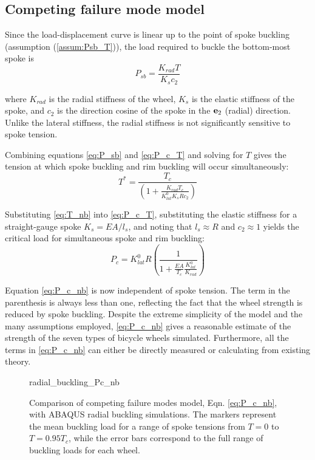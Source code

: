 \documentclass[\rootdir/thesis.tex]{subfiles}
\begin{document}
\subsection{Competing failure mode model}

Since the load-displacement curve is linear up to the point of spoke buckling (assumption (\ref{assum:Psb_T})), the load required to buckle the bottom-most spoke is
\begin{equation}
\label{eq:P_sb}
P_{sb} = \frac{K_{rad}T}{K_s c_2}
\end{equation}

where $K_{rad}$ is the radial stiffness of the wheel, $K_s$ is the elastic stiffness of the spoke, and $c_2$ is the direction cosine of the spoke in the $\mathbf{e}_2$ (radial) direction. Unlike the lateral stiffness, the radial stiffness is not significantly sensitive to spoke tension.

Combining equations \eqref{eq:P_sb} and \eqref{eq:P_c_T} and solving for $T$ gives the tension at which spoke buckling and rim buckling will occur simultaneously:
\begin{equation}
\label{eq:T_nb}
T^* = \frac{T_c}{\left(1 + \frac{K_{rad}T_c}{K_{lat}^0 K_s R c_2}\right)}
\end{equation}

Substituting \eqref{eq:T_nb} into \eqref{eq:P_c_T}, substituting the elastic stiffness for a straight-gauge spoke $K_s=EA/l_s$, and noting that $l_s \approx R$ and $c_2\approx 1$ yields the critical load for simultaneous spoke and rim buckling:
\begin{equation}
\label{eq:P_c_nb}
P_c = K_{lat}^0 R \left(\frac{1}{1 + \frac{EA}
						{T_c}\frac{K_{lat}^0}{K_{rad}}}\right)
\end{equation}

Equation \eqref{eq:P_c_nb} is now independent of spoke tension. The term in the parenthesis is always less than one, reflecting the fact that the wheel strength is reduced by spoke buckling. Despite the extreme simplicity of the model and the many assumptions employed, \eqref{eq:P_c_nb} gives a reasonable estimate of the strength of the seven types of bicycle wheels simulated. Furthermore, all the terms in \eqref{eq:P_c_nb} can either be directly measured or calculating from existing theory.

\begin{figure}[h]
\centering
{radial_buckling_Pc_nb}
\caption{Comparison of competing failure modes model, Eqn. \eqref{eq:P_c_nb}, with ABAQUS radial buckling simulations. The markers represent the mean buckling load for a range of spoke tensions from $T=0$ to $T=0.95T_c$, while the error bars correspond to the full range of buckling loads for each wheel.}
\label{fig:Pc_rad_theory_comp}
\end{figure}
\end{document}
